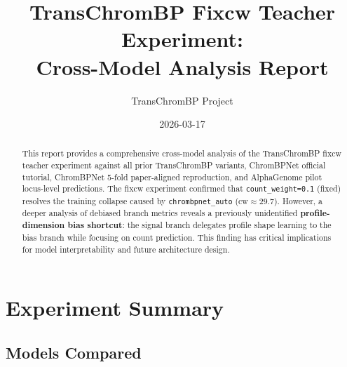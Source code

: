 \documentclass[11pt,a4paper]{article}
\title{TransChromBP Fixcw Teacher Experiment:\\Cross-Model Analysis Report}
\author{TransChromBP Project}
\date{2026-03-17}
\begin{document}
\maketitle

\begin{abstract}
This report provides a comprehensive cross-model analysis of the TransChromBP fixcw teacher experiment against all prior TransChromBP variants, ChromBPNet official tutorial, ChromBPNet 5-fold paper-aligned reproduction, and AlphaGenome pilot locus-level predictions. The fixcw experiment confirmed that \texttt{count\_weight=0.1} (fixed) resolves the training collapse caused by \texttt{chrombpnet\_auto} ($\text{cw}\approx29.7$). However, a deeper analysis of debiased branch metrics reveals a previously unidentified \textbf{profile-dimension bias shortcut}: the signal branch delegates profile shape learning to the bias branch while focusing on count prediction. This finding has critical implications for model interpretability and future architecture design.
\end{abstract}

\tableofcontents
\newpage

\section{Experiment Summary}

\subsection{Models Compared}
\end{document}
